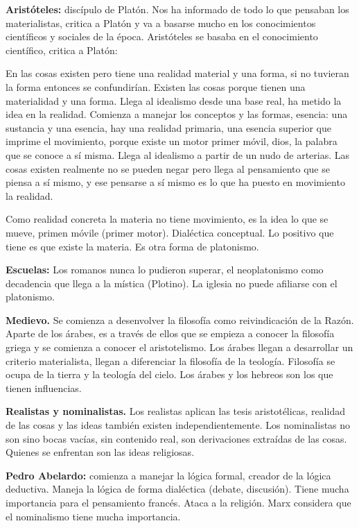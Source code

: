 \documentclass[
  a4paper,
]{article}
\begin{document}
\textbf{Aristóteles:} discípulo de Platón. Nos ha informado de todo lo
que pensaban los materialistas, critica a Platón y va a basarse mucho en
los conocimientos científicos y sociales de la época. Aristóteles se
basaba en el conocimiento científico, critica a Platón:

En las cosas existen pero tiene una realidad material y una forma, si no
tuvieran la forma entonces se confundirían. Existen las cosas porque
tienen una materialidad y una forma. Llega al idealismo desde una base
real, ha metido la idea en la realidad. Comienza a manejar los conceptos
y las formas, esencia: una sustancia y una esencia, hay una realidad
primaria, una esencia superior que imprime el movimiento, porque existe
un motor primer móvil, dios, la palabra que se conoce a sí misma. Llega
al idealismo a partir de un nudo de arterias. Las cosas existen
realmente no se pueden negar pero llega al pensamiento que se piensa a
sí mismo, y ese pensarse a sí mismo es lo que ha puesto en movimiento la
realidad.

Como realidad concreta la materia no tiene movimiento, es la idea lo que
se mueve, primen móvile (primer motor). Dialéctica conceptual. Lo
positivo que tiene es que existe la materia. Es otra forma de
platonismo.

\textbf{Escuelas:} Los romanos nunca lo pudieron superar, el
neoplatonismo como decadencia que llega a la mística (Plotino). La
iglesia no puede afiliarse con el platonismo.

\textbf{Medievo.} Se comienza a desenvolver la filosofía como
reivindicación de la Razón. Aparte de los árabes, es a través de ellos
que se empieza a conocer la filosofía griega y se comienza a conocer el
aristotelismo. Los árabes llegan a desarrollar un criterio materialista,
llegan a diferenciar la filosofía de la teología. Filosofía se ocupa de
la tierra y la teología del cielo. Los árabes y los hebreos son los que
tienen influencias.

\textbf{Realistas y nominalistas.} Los realistas aplican las tesis
aristotélicas, realidad de las cosas y las ideas también existen
independientemente. Los nominalistas no son sino bocas vacías, sin
contenido real, son derivaciones extraídas de las cosas. Quienes se
enfrentan son las ideas religiosas.

\textbf{Pedro Abelardo:} comienza a manejar la lógica formal, creador de
la lógica deductiva. Maneja la lógica de forma dialéctica (debate,
discusión). Tiene mucha importancia para el pensamiento francés. Ataca a
la religión. Marx considera que el nominalismo tiene mucha importancia.
\end{document}
